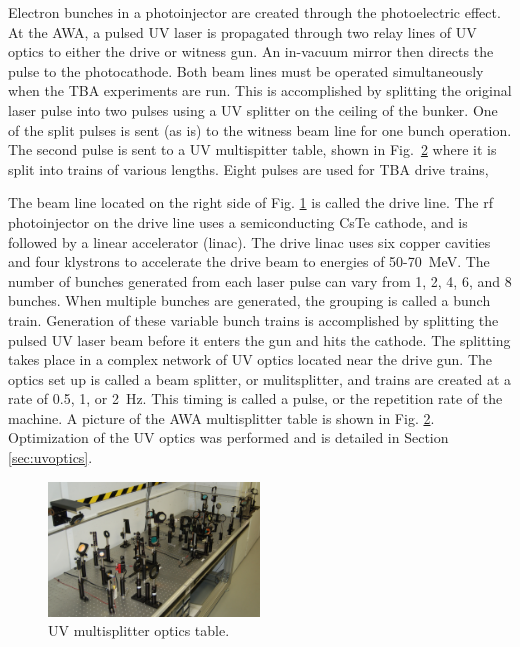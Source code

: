 \documentclass{iitthesis}
\begin{document}
Electron bunches in a photoinjector are created through the photoelectric effect. 
At the AWA, a pulsed UV laser is propagated through two relay lines of UV optics to either
the drive or witness gun. An in-vacuum mirror then directs the pulse to the photocathode.
Both beam lines must be operated simultaneously when the TBA experiments are run. This is accomplished by
splitting the original laser pulse into two pulses using a UV splitter on the 
ceiling of the bunker. One of the split pulses is sent (as is) to the witness beam line for one
bunch operation. The second pulse is sent to a UV multispitter table, shown in 
Fig.~\ref{fig:optics} where it is split into trains of various lengths. Eight pulses are 
used for TBA drive trains, 

The beam line located on the right side of Fig. \ref{fig:bunker} is called the
drive line. The rf photoinjector on the drive line uses a semiconducting
CsTe cathode, and is followed by a linear accelerator (linac). The
drive linac uses six copper cavities and four klystrons to accelerate the drive beam
to energies of 50-\SI{70}{MeV}. The number of bunches generated from each 
laser pulse can vary from 1, 2, 4, 6, and 8 bunches. When multiple bunches
are generated, the grouping is called a bunch train. Generation of
these variable bunch trains is accomplished by splitting the pulsed
UV laser beam before it enters the gun and hits the cathode. The splitting
takes place in a complex network of UV optics located near the drive
gun. The optics set up is called a beam splitter, or mulitsplitter,
and trains are created at a rate of 0.5, 1, or \SI{2}{Hz}. This timing is
called a pulse, or the repetition rate of the machine. A picture of
the AWA multisplitter table is shown in Fig. \ref{fig:optics}. Optimization 
of the UV optics was performed and is detailed in Section \ref{sec:uvoptics}.  

\iftrue
\begin{figure}
	\begin{center}
		\label{fig:bunker}
	\end{center}
\end{figure}
\begin{figure}[h]
	\begin{center}
		\includegraphics[width=0.5\textwidth]{images/multisplitter}\caption{UV multisplitter optics table.}
	\end{center}
	\label{fig:optics}
\end{figure}
\fi
\end{document}
